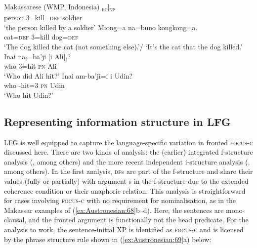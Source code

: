 \documentclass[output=paper,chinesefont]{../langscibook}
\begin{document}
\ea\label{ex:Austronesian:68} Makassarese (WMP, Indonesia) \citep[238, 343, 353]{Jukes2006}
\ea\gll
[tau [na=buno=a sorodadu]\textsubscript{\textsc{rc}}]\textsubscript{\textsc{np}} \\
 \phantom{[}person \phantom{[}3=kill=\textsc{def} soldier\\
\glt  `the person killed by a soldier'
\ex\gll
Miong=a na=buno kongkong=a.\\
cat=\textsc{def} 3=kill dog=\textsc{def}\\
\glt`The dog killed the cat (not something else).'/ `It's the cat that the dog killed.'
\ex\gll
Inai na$_i$=ba'ji [i Ali]$_i$? \\
who 3=hit \phantom{[}\textsc{pn} Ali\\
\glt`Who did Ali hit?'
\ex\gll
Inai am-ba'ji=i i Udin?\\
who \AV-hit=3 \textsc{pn} Udin\\
\glt`Who hit Udin?'
\z\z

\newpage
\subsection{Representing information structure in LFG}
\label{sec:Austronesian:6.3}

LFG is well equipped to capture the language-specific variation in fronted {\textsc{fo\-cus-c}} discussed here. There are two kinds of analysis: the (earlier) integrated f-structure analysis (\citealt{BM87,King95}, among others) and the more recent independent i-structure analysis (\citealt{BK96,DN}, among others). In the first analysis, \textsc{df}s are part of the f-structure and share their values (fully or partially) with argument {\GF}s in the f-structure due to the extended coherence condition \citep{Zaenen1985} or their anaphoric relation. This analysis is straightforward for cases involving \textsc{focus-c} with no requirement for nominalisation, as in the Makassar examples of (\ref{ex:Austronesian:68}b--d). Here, the sentences are mono-clausal, and the fronted argument is functionally not the head predicate. For the analysis to work, the sentence-initial XP is identified as \textsc{focus-c} and is licensed by the phrase structure rule shown in (\ref{ex:Austronesian:69}a) below:
\end{document}
